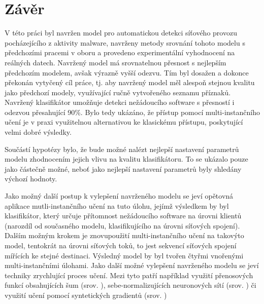 \chapter*{Závěr}

V této práci byl navržen model pro automatickou detekci síťového provozu pocházejícího z aktivity malware, navrženy metody srovnání tohoto modelu s předchozími pracemi v oboru a provedeno experimentální vyhodnocení na reálných datech. Navržený model má srovnatelnou přesnost s nejlepším předchozím modelem, avšak výrazně vyšší odezvu. Tím byl dosažen a dokonce překonán vytyčený cíl práce, tj. aby navržený model měl alespoň stejnou kvalitu jako předchozí modely, využívající ručně vytvořeného seznamu příznaků. Navržený klasifikátor umožňuje detekci nežádoucího software s přesností i odezvou přesahující 90\%. Bylo tedy ukázáno, že přístup pomocí multi-instančního učení je v praxi využitelnou alternativou ke klasickému přístupu, poskytující velmi dobré výsledky.

Součástí hypotézy bylo, že bude možné nalézt nejlepší nastavení parametrů modelu zhodnocením jejich vlivu na kvalitu klasifikátoru. To se ukázalo pouze jako částečně možné, neboť jako nejlepší nastavení parametrů byly shledány výchozí hodnoty. 

Jako možný další postup k vylepšení navrženého modelu se jeví opětovná aplikace mutli-instančního učení na tuto úlohu, jejímž výsledkem by byl klasifikátor, který určuje přítomnost nežádoucího software na úrovni klientů (narozdíl od současného modelu, klasifikujícího na úrovni síťových spojení). Dalším možným krokem je znovupoužití multi-instančního učení na takovýto model, tentokrát na úrovni síťových toků, to jest sekvencí síťových spojení mířících ke stejné destinaci. Výsledný model by byl tvořen čtyřmi vnořenými multi-instančními úlohami. Jako další možné vylepšení navrženého modelu se jeví techniky zrychlující proces učení. Mezi tyto patří například využití přenosových funkcí obsahujících šum (srov. \cite{gulcehre_noisy_2016}), sebe-normalizujících neuronových sítí (srov. \cite{klambauer_self-normalizing_2017}) či využití učení pomocí syntetických gradientů (srov. \cite{jaderberg_decoupled_2016})
